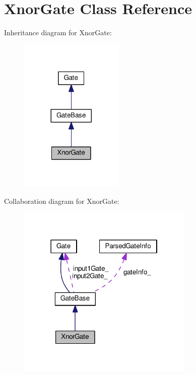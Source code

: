 \hypertarget{classXnorGate}{}\section{Xnor\+Gate Class Reference}
\label{classXnorGate}


Inheritance diagram for Xnor\+Gate\+:
\nopagebreak
\begin{figure}[H]
\begin{center}
\leavevmode
\includegraphics[width=140pt]{classXnorGate__inherit__graph}
\end{center}
\end{figure}


Collaboration diagram for Xnor\+Gate\+:
\nopagebreak
\begin{figure}[H]
\begin{center}
\leavevmode
\includegraphics[width=238pt]{classXnorGate__coll__graph}
\end{center}
\end{figure}
